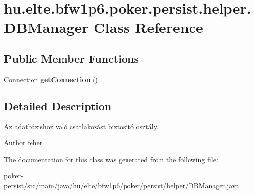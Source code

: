 \hypertarget{classhu_1_1elte_1_1bfw1p6_1_1poker_1_1persist_1_1helper_1_1_d_b_manager}{}\section{hu.\+elte.\+bfw1p6.\+poker.\+persist.\+helper.\+D\+B\+Manager Class Reference}
\label{classhu_1_1elte_1_1bfw1p6_1_1poker_1_1persist_1_1helper_1_1_d_b_manager}
\subsection*{Public Member Functions}
\begin{DoxyCompactItemize}
\item 
\hypertarget{classhu_1_1elte_1_1bfw1p6_1_1poker_1_1persist_1_1helper_1_1_d_b_manager_a430acd3a8cd1b0bd3f9c3439e060c034}{}Connection {\bfseries get\+Connection} ()\label{classhu_1_1elte_1_1bfw1p6_1_1poker_1_1persist_1_1helper_1_1_d_b_manager_a430acd3a8cd1b0bd3f9c3439e060c034}

\end{DoxyCompactItemize}


\subsection{Detailed Description}
Az adatbázishoz való csatlakozást biztosító osztály. \begin{DoxyAuthor}{Author}
feher 
\end{DoxyAuthor}


The documentation for this class was generated from the following file\+:\begin{DoxyCompactItemize}
\item 
poker-\/persist/src/main/java/hu/elte/bfw1p6/poker/persist/helper/D\+B\+Manager.\+java\end{DoxyCompactItemize}
